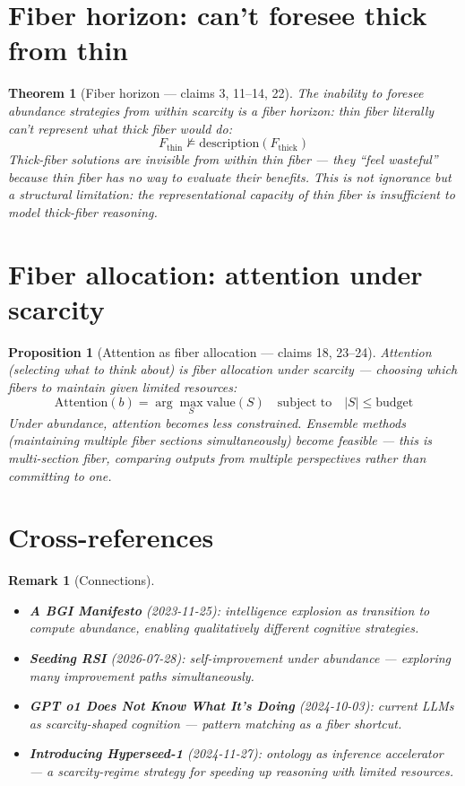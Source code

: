 \documentclass[11pt,a4paper]{article}
\newtheorem{theorem}[definition]{Theorem}
\newtheorem{proposition}[definition]{Proposition}
\newtheorem{remark}[definition]{Remark}
\begin{document}
\section{Fiber horizon: can't foresee thick from thin}

\begin{theorem}[Fiber horizon --- claims 3, 11--14, 22]
The inability to foresee abundance strategies from within scarcity is a
\emph{fiber horizon}: thin fiber literally can't represent what thick
fiber would do:
\[
  F_{\text{thin}} \not\models \text{description}(F_{\text{thick}})
\]
Thick-fiber solutions are invisible from within thin fiber --- they
``feel wasteful'' because thin fiber has no way to evaluate their
benefits. This is not ignorance but a structural limitation: the
representational capacity of thin fiber is insufficient to model
thick-fiber reasoning.
\end{theorem}

\section{Fiber allocation: attention under scarcity}

\begin{proposition}[Attention as fiber allocation --- claims 18, 23--24]
Attention (selecting what to think about) is fiber allocation under
scarcity --- choosing which fibers to maintain given limited resources:
\[
  \text{Attention}(b) = \arg\max_S \text{value}(S) \quad
  \text{subject to} \quad |S| \leq \text{budget}
\]
Under abundance, attention becomes less constrained. Ensemble methods
(maintaining multiple fiber sections simultaneously) become feasible ---
this is multi-section fiber, comparing outputs from multiple perspectives
rather than committing to one.
\end{proposition}

\section{Cross-references}

\begin{remark}[Connections]
\begin{itemize}
\item \textbf{A BGI Manifesto} (2023-11-25): intelligence explosion
  as transition to compute abundance, enabling qualitatively different
  cognitive strategies.
\item \textbf{Seeding RSI} (2026-07-28): self-improvement under abundance
  --- exploring many improvement paths simultaneously.
\item \textbf{GPT o1 Does Not Know What It's Doing} (2024-10-03):
  current LLMs as scarcity-shaped cognition --- pattern matching as
  a fiber shortcut.
\item \textbf{Introducing Hyperseed-1} (2024-11-27): ontology as
  inference accelerator --- a scarcity-regime strategy for speeding
  up reasoning with limited resources.
\end{itemize}
\end{remark}
\end{document}
